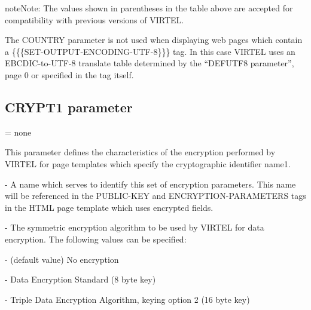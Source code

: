 \documentclass[letterpaper,10pt,english]{sphinxmanual}
\begin{document}
\begin{sphinxadmonition}{note}{Note:}
The values shown in parentheses in the table above are accepted for compatibility with previous versions of VIRTEL.
\end{sphinxadmonition}

The COUNTRY parameter is not used when displaying web pages which contain a \{\{\{SET-OUTPUT-ENCODING-UTF-8\}\}\} tag. In this case VIRTEL uses an EBCDIC-to-UTF-8 translate table determined by the “DEFUTF8 parameter”, page 0 or specified in the tag itself.


\subsection{CRYPT1 parameter}
\label{\detokenize{Installation_Guide:crypt1-parameter}}\label{\detokenize{Installation_Guide:index-48}}
\begin{sphinxVerbatim}[commandchars=\\\{\}]
\PYG{p}{[}\PYG{p}{]}\PYG{p}{[}\PYG{p}{]}\PYG{p}{[}\PYG{p}{]}\PYG{p}{[}\PYG{p}{]}\PYG{p}{[}\PYG{p}{]}\PYG{p}{[}\PYG{p}{]}
\end{sphinxVerbatim}

 = none

This parameter defines the characteristics of the encryption performed by VIRTEL for page templates which specify the cryptographic identifier name1.

 - A name which serves to identify this set of encryption parameters. This name will be referenced in the PUBLIC-KEY and ENCRYPTION-PARAMETERS tags in the HTML page template which uses encrypted fields.

 - The symmetric encryption algorithm to be used by VIRTEL for data encryption. The following values can be specified:

 - (default value) No encryption

 - Data Encryption Standard (8 byte key)

 - Triple Data Encryption Algorithm, keying option 2 (16 byte key)
\end{document}

